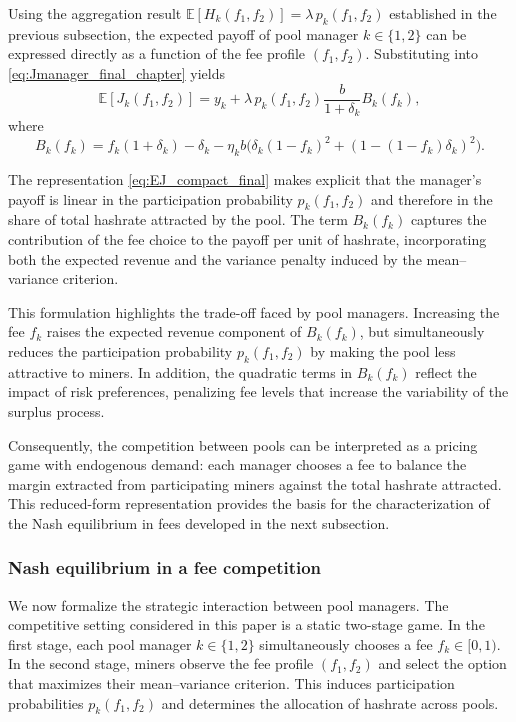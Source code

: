 Using the aggregation result $\mathbb{E}[H_k(f_1,f_2)] = \lambda\,p_k(f_1,f_2)$ established in the previous subsection, the expected payoff of pool manager $k\in\{1,2\}$ can be expressed directly as a function of the fee profile $(f_1,f_2)$. Substituting into \eqref{eq:Jmanager_final_chapter} yields
\begin{equation}\label{eq:EJ_compact_final}
\mathbb{E}[J_k(f_1,f_2)]
=
y_k
+
\lambda\,p_k(f_1,f_2)\frac{b}{1+\delta_k}B_k(f_k),
\end{equation}
where
\begin{equation}
B_k(f_k)
=
f_k(1+\delta_k)-\delta_k
-\eta_k b
\Big(
\delta_k(1-f_k)^2+(1-(1-f_k)\delta_k)^2
\Big).
\end{equation}

The representation \eqref{eq:EJ_compact_final} makes explicit that the manager’s payoff is linear in the participation probability $p_k(f_1,f_2)$ and therefore in the share of total hashrate attracted by the pool. The term $B_k(f_k)$ captures the contribution of the fee choice to the payoff per unit of hashrate, incorporating both the expected revenue and the variance penalty induced by the mean--variance criterion.

This formulation highlights the trade-off faced by pool managers. Increasing the fee $f_k$ raises the expected revenue component of $B_k(f_k)$, but simultaneously reduces the participation probability $p_k(f_1,f_2)$ by making the pool less attractive to miners. In addition, the quadratic terms in $B_k(f_k)$ reflect the impact of risk preferences, penalizing fee levels that increase the variability of the surplus process.

Consequently, the competition between pools can be interpreted as a pricing game with endogenous demand: each manager chooses a fee to balance the margin extracted from participating miners against the total hashrate attracted. This reduced-form representation provides the basis for the characterization of the Nash equilibrium in fees developed in the next subsection.

\subsubsection{Nash equilibrium in a fee competition}

We now formalize the strategic interaction between pool managers. The competitive setting considered in this paper is a static two-stage game. In the first stage, each pool manager $k\in\{1,2\}$ simultaneously chooses a fee $f_k \in [0,1)$. In the second stage, miners observe the fee profile $(f_1,f_2)$ and select the option that maximizes their mean--variance criterion. This induces participation probabilities $p_k(f_1,f_2)$ and determines the allocation of hashrate across pools.

